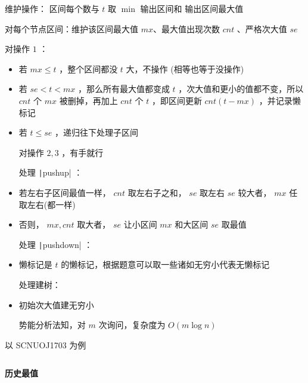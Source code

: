 \documentclass[twocolumn,10pt]{ctexart}
\makeatletter
\newcommand{\cds}[1]{\ding{\numexpr191+#1\relax}}
\newcommand{\hfive}[1]{\par\addvspace{6pt}\@afterindentfalse
  {\noindent\bfseries\normalsize #1}\par\nobreak\vspace{2pt}}
\makeatother
\begin{document}
维护操作：\cds{1} 区间每个数与 $t$ 取 $\min$ \cds{2} 输出区间和 \cds{3} 输出区间最大值

对每个节点区间：维护该区间最大值 $mx$、最大值出现次数 $cnt$ 、严格次大值 $se$

对操作 $1$ ：

\begin{itemize}
\item 若 $mx\le t$ ，整个区间都没 $t$ 大，不操作 (相等也等于没操作)
\item 若 $se < t < mx$  ，那么所有最大值都变成 $t$ ，次大值和更小的值都不变，所以 $cnt$ 个 $mx$ 被删掉，再加上 $cnt$ 个 $t$ ，即区间更新 $cnt(t-mx)$ ，并记录懒标记
\item 若 $t\le se$ ，递归往下处理子区间

对操作 $2,3$ ，有手就行

处理 \texttt|pushup| ：
\end{itemize}

\begin{itemize}
\item 若左右子区间最值一样， $cnt$ 取左右子之和， $se$ 取左右 $se$ 较大者， $mx$ 任取左右(都一样)
\item 否则， $mx,cnt$ 取大者， $se$ 让小区间 $mx$ 和大区间 $se$ 取最值

处理 \texttt|pushdown| ：
\end{itemize}

\begin{itemize}
\item 懒标记是 $t$ 的懒标记，根据题意可以取一些诸如无穷小代表无懒标记

处理建树：
\end{itemize}

\begin{itemize}
\item 初始次大值建无穷小

势能分析法知，对 $m$ 次询问，复杂度为 $O(m\log n)$
\end{itemize}

\begin{notebox}
以 SCNUOJ1703 为例
\end{notebox}

\inputminted{cpp}{code/segtree_teacher_ji.cpp}

\hfive{历史最值}
\end{document}
